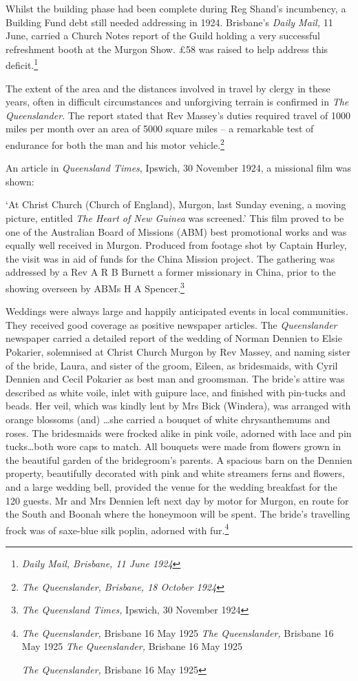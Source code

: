 Whilst the building phase had been complete during Reg Shand's
incumbency, a Building Fund debt still needed addressing in 1924.
Brisbane's \emph{Daily Mail,} 11 June, carried a Church Notes report of
the Guild holding a very successful refreshment booth at the Murgon
Show. \pounds58 was raised to help address this deficit.\footnote{\emph{Daily
  Mail, Brisbane, 11 June 1924}}

The extent of the area and the distances involved in travel by clergy in
these years, often in difficult circumstances and unforgiving terrain is
confirmed in \emph{The Queenslander}. The report stated that Rev
Massey's duties required travel of 1000 miles per month over an area of
5000 square miles -- a remarkable test of endurance for both the man and
his motor vehicle.\footnote{\emph{The Queenslander, Brisbane, 18 October
  1924}}

An article in \emph{Queensland Times}, Ipswich, 30 November 1924, a
missional film was shown:

`At Christ Church (Church of England), Murgon, last Sunday evening, a
moving picture, entitled \emph{The Heart of New Guinea} was screened.'
This film proved to be one of the Australian Board of Missions (ABM)
best promotional works and was equally well received in Murgon. Produced
from footage shot by Captain Hurley, the visit was in aid of funds for
the China Mission project\emph{.} The gathering was addressed by a Rev A
R B Burnett a former missionary in China, prior to the showing overseen
by ABMs H A Spencer.\footnote{\emph{The Queensland Times,} Ipswich, 30
  November 1924}

Weddings were always large and happily anticipated events in local
communities. They received good coverage as positive newspaper articles.
The \emph{Queenslander} newspaper carried a detailed report of the
wedding of Norman Dennien to Elsie Pokarier, solemnised at Christ Church
Murgon by Rev Massey, and naming sister of the bride, Laura, and sister
of the groom, Eileen, as bridesmaids, with Cyril Dennien and Cecil
Pokarier as best man and groomsman. The bride's attire was described as
white voile, inlet with guipure lace, and finished with pin-tucks and
beads. Her veil, which was kindly lent by Mrs Bick (Windera), was
arranged with orange blossoms (and) \ldots she carried a bouquet of
white chrysanthemums and roses. The bridesmaids were frocked alike in
pink voile, adorned with lace and pin tucks\ldots both wore caps to
match. All bouquets were made from flowers grown in the beautiful garden
of the bridegroom's parents. A spacious barn on the Dennien property,
beautifully decorated with pink and white streamers ferns and flowers,
and a large wedding bell, provided the venue for the wedding breakfast
for the 120 guests. Mr and Mrs Dennien left next day by motor for
Murgon, en route for the South and Boonah where the honeymoon will be
spent. The bride's travelling frock was of saxe-blue silk poplin,
adorned with fur.\footnote{\emph{The Queenslander,} Brisbane 16 May 1925
  \emph{The Queenslander,} Brisbane 16 May 1925 \emph{The Queenslander,}
  Brisbane 16 May 1925

  \emph{The Queenslander,} Brisbane 16 May 1925}

